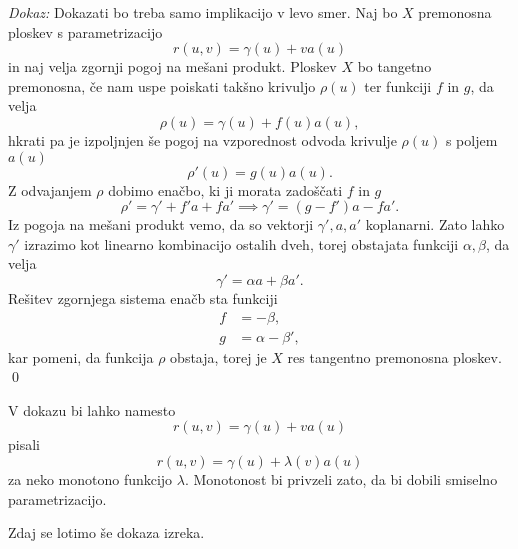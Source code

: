 \noindent
{\em Dokaz:\/}
Dokazati bo treba samo implikacijo v levo smer. Naj bo $X$ premonosna ploskev s parametrizacijo \begin{equation*}
r(u,v) = \gamma(u) + v a(u)
\end{equation*} in naj velja zgornji pogoj na mešani produkt.
Ploskev $X$ bo tangetno premonosna, če nam uspe poiskati takšno krivuljo $\rho(u)$ ter funkciji $f$ in $g$, da velja 
\begin{equation*}
  \rho(u) = \gamma(u) + f(u)a(u),
  \end{equation*}hkrati pa je izpoljnjen še pogoj na vzporednost odvoda krivulje $\rho(u)$ s poljem $a(u)$ \begin{equation*}
    \rho'(u) = g(u) a(u).
    \end{equation*} 
Z odvajanjem $\rho$ dobimo enačbo, ki ji morata zadoščati $f$ in $g$ \begin{equation*}
\rho' = \gamma' + f'a + f a' \implies \gamma' = (g - f') a - fa'.
\end{equation*}  
Iz pogoja na mešani produkt vemo, da so vektorji $\gamma', a, a'$ koplanarni. Zato lahko $\gamma'$ izrazimo kot linearno kombinacijo ostalih dveh, torej
obstajata funkciji $\alpha, \beta$, da velja
\begin{equation*}
\gamma' = \alpha a + \beta a'.
\end{equation*}  
Rešitev zgornjega sistema enačb sta funkciji \begin{align*}
    f &= -\beta, \\
    g &= \alpha - \beta', 
\end{align*}
kar pomeni, da funkcija $\rho$ obstaja, torej je $X$ res tangentno premonosna ploskev.
\qed

\begin{opomba}
V dokazu bi lahko namesto \begin{equation*} r(u,v) = \gamma(u) + v a(u) \end{equation*} pisali 
\begin{equation*} r(u,v) = \gamma(u) + \lambda(v) a(u) \end{equation*} za neko monotono funkcijo $\lambda$.
Monotonost bi privzeli zato, da bi dobili smiselno parametrizacijo.
\end{opomba}

Zdaj se lotimo še dokaza izreka.

